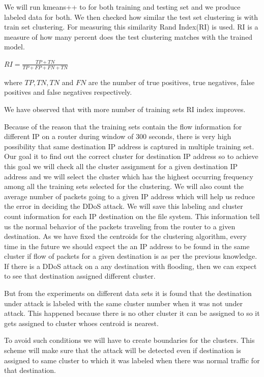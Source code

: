\documentclass[10pt,oneside,a4paper]{article}
\begin{document}
We will run kmeans++ to for both training and testing set and we produce labeled data for both. We then checked how similar the test set clustering is with train set clustering. For measuring this similarity Rand Index(RI)\cite{ri-index} is used. RI is a measure of how many percent does the test clustering matches with the trained model.

\hspace{4cm} $RI={\frac {TP+TN}{TP+FP+FN+TN}}$

where $TP, TN, TN$ and $FN$ are the number of true positives, true negatives, false positives and false negatives respectively.

We have observed that with more number of training sets RI index improves.

Because of the reason that the training sets contain the flow information for different IP on a router during window of 300 seconds, there is very high possibility that same destination IP address is captured in multiple training set. Our goal it to find out the correct cluster for destination IP address so to achieve this goal we will check all the cluster assignment for a given destination IP address and we will select the cluster which has the highest occurring frequency among all the training sets selected for the clustering. We will also count the average number of packets going to a given IP address which will help us reduce the error in deciding the DDoS attack. We will save this labeling and cluster count information for each IP destination on the file system. This information tell us the normal behavior of the packets traveling from the router to a given destination. As we have fixed the centroids for the clustering algorithm, every time in the future we should expect the an IP address to be found in the same cluster if flow of packets for a given destination is as per the previous knowledge. If there is a DDoS attack on a any destination with flooding, then we can expect to see that destination assigned different cluster.

But from the experiments on different data sets it is found that the destination under attack is labeled with the same cluster number when it was not under attack. This happened because there is no other cluster it can be assigned to so it gets assigned to cluster whoes centroid is nearest.

To avoid such conditions we will have to create boundaries for the clusters. This scheme will make sure that the attack will be detected even if destination is assigned to same cluster to which it was labeled when there was normal traffic for that destination.
\end{document}
